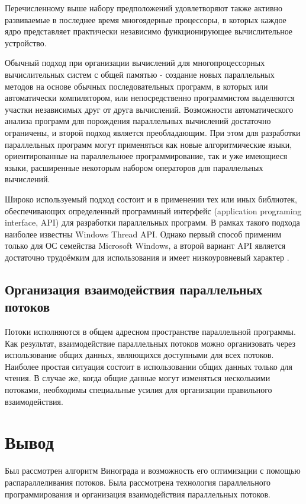 \documentclass[a4paper,12pt]{report}
\begin{document}
    		Перечисленному выше набору предположений удовлетворяют также активно развиваемые в последнее время многоядерные процессоры, в которых каждое ядро представляет практически независимо функционирующее вычислительное устройство.
    		
    		Обычный подход при организации вычислений для многопроцессорных вычислительных систем с общей памятью - создание новых параллельных методов на основе обычных последовательных программ, в которых или автоматически компилятором, или непосредственно программистом выделяются участки независимых друг от друга вычислений.
    		Возможности автоматического анализа программ для порождения параллельных вычислений достаточно ограничены, и второй подход является преобладающим. При этом для разработки параллельных программ могут применяться как новые алгоритмические языки, ориентированные на параллельноее программирование, так и уже имеющиеся языки, расширенные некоторым набором операторов для параллельных вычислений.
    		
    		Широко используемый подход состоит и в применении тех или иных библиотек, обеспечивающих определенный программный интерфейс (application programing interface, API) для разработки параллельных программ. В рамках такого подхода наиболее известны Windows Thread API. Однако первый способ применим только для ОС семейства Microsoft Windows, а второй вариант API является достаточно трудоёмким для использования и имеет низкоуровневый характер \cite{Barkalov}.
    	
    \subsection{Организация взаимодействия параллельных потоков}
    
    		Потоки исполняются в общем адресном пространстве параллельной программы.
    		Как результат, взаимодействие параллельных потоков можно организовать через использование общих данных, являющихся доступными для всех потоков.
    		Наиболее простая ситуация состоит в использовании общих данных только для чтения. В случае же, когда общие данные могут изменяться несколькими потоками, необходимы специальные усилия для организации правильного взаимодействия.

    \section{Вывод}

    		Был рассмотрен алгоритм Винограда и возможность его оптимизации с помощью распараллеливания потоков.
    		Была рассмотрена технология параллельного программирования и организация взаимодействия параллельных потоков. 
\end{document}
